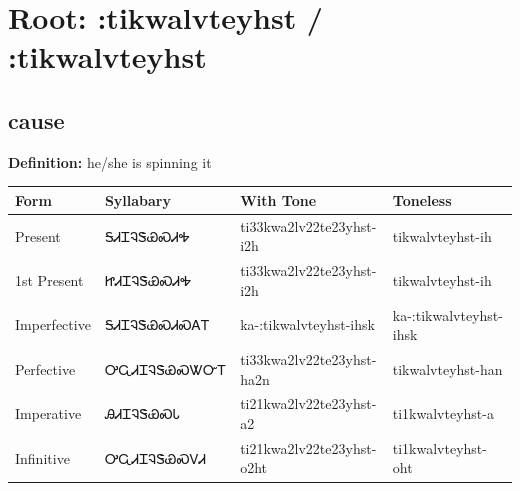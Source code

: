 \documentclass{article}%
\begin{document}
%
\normalsize%
\section*{Root: :tikwalvteyhst / :tikwalvteyhst}%
\subsection*{cause}%
\textbf{Definition: }%
he/she is spinning it%
\\[0.5em]%
\begin{tabular}{|l|l|l|l|}%
\hline%
\textbf{Form}&\textbf{Syllabary}&\textbf{With Tone}&\textbf{Toneless}\\%
\hline%
Present&ᎦᏗᏆᎸᏕᏯᏍᏗᎭ&ti33kwa2lv22te23yhst{-}i2h&tikwalvteyhst{-}ih\\%
1st Present&ᏥᏗᏆᎸᏕᏯᏍᏗᎭ&ti33kwa2lv22te23yhst{-}i2h&tikwalvteyhst{-}ih\\%
Imperfective&ᎦᏗᏆᎸᏕᏯᏍᏗᏍᎪᎢ&ka{-}:tikwalvteyhst{-}ihsk&ka{-}:tikwalvteyhst{-}ihsk\\%
Perfective&ᎤᏩᏗᏆᎸᏕᏯᏍᏔᏅᎢ&ti33kwa2lv22te23yhst{-}ha2n&tikwalvteyhst{-}han\\%
Imperative&ᎯᏗᏆᎸᏕᏯᏍᏓ&ti21kwa2lv22te23yhst{-}a2&ti1kwalvteyhst{-}a\\%
Infinitive&ᎤᏩᏗᏆᎸᏕᏯᏍᏙᏗ&ti21kwa2lv22te23yhst{-}o2ht&ti1kwalvteyhst{-}oht\\%
\hline%
\end{tabular}%
\\[1em]%
\end{document}

